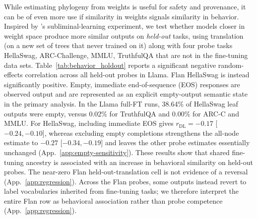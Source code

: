 \documentclass{article}
\theoremstyle{definition}
\theoremstyle{plain}
\begin{document}
While estimating phylogeny from weights is useful for safety and provenance, it can be of even more use if similarity in weights signals similarity in behavior. Inspired by \citet{cloud2025subliminal}'s subliminal-learning experiment, we test
whether models closer in weight space produce more similar outputs on \textit{held-out} tasks, using translation
(on a new set of trees that never trained on it) along with four probe tasks HellaSwag, ARC-Challenge, MMLU, TruthfulQA that are not in the fine-tuning data sets.
Table~\ref{tab:behavior_holdout} reports a significant negative random-effects correlation across all held-out
probes in Llama. Flan HellaSwag is instead significantly positive. Empty, immediate
end-of-sequence (EOS) responses are observed output and are represented as an explicit empty-output
semantic state in the primary analysis. In the Llama full-FT runs,
38.64\% of HellaSwag leaf outputs were empty, versus 0.02\% for TruthfulQA and 0.00\% for ARC-C
and MMLU. For HellaSwag, including immediate EOS gives $r_{\mathrm{DL}}=-0.17$ [$-0.24,-0.10$], whereas excluding empty completions strengthens the all-node estimate to $-0.27$ [$-0.34,-0.19$] and leaves the other probe estimates essentially unchanged (App.~\ref{app:empty-sensitivity}). These results show that shared fine-tuning ancestry is associated with an increase in behavioral similarity on held-out probes. The near-zero Flan held-out-translation cell is not evidence of a reversal (App.~\ref{app:regression}).
Across the Flan probes, some outputs instead revert to label vocabularies inherited from fine-tuning tasks; we therefore interpret the entire Flan row as behavioral association rather than probe competence (App.~\ref{app:regression}).
\end{document}
